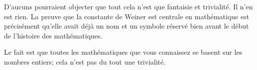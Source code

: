 D'aucuns pourraient objecter que tout cela n'est que fantaisie et trivialité. Il n'en est rien. La preuve que la constante de Weiner est centrale en mathématique est précisément qu'elle avait déjà un nom et un symbole réservé bien avant le début de l'histoire des mathématiques.

Le fait est que toutes les mathématiques que vous connaissez se basent sur les nombres entiers; cela n'est pas du tout une trivialité.

